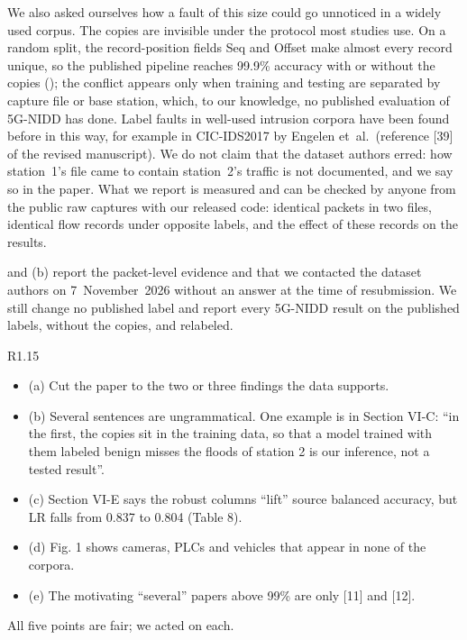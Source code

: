 We also asked ourselves how a fault of this size could go unnoticed in a widely used corpus. The copies are invisible under the protocol most studies use. On a random split, the record-position fields Seq and Offset make almost every record unique, so the published pipeline reaches 99.9\% accuracy with or without the copies (); the conflict appears only when training and testing are separated by capture file or base station, which, to our knowledge, no published evaluation of 5G-NIDD has done. Label faults in well-used intrusion corpora have been found before in this way, for example in CIC-IDS2017 by Engelen et~al.\ (reference [39] of the revised manuscript). We do not claim that the dataset authors erred: how station~1's file came to contain station~2's traffic is not documented, and we say so in the paper. What we report is measured and can be checked by anyone from the public raw captures with our released code: identical packets in two files, identical flow records under opposite labels, and the effect of these records on the results.

\action {} and (b) report the packet-level evidence and that we contacted the dataset authors on 7~November~2026 without an answer at the time of resubmission. We still change no published label and report every 5G-NIDD result on the published labels, without the copies, and relabeled.

\label{rv:R1.15}
\begin{concern}{R1.15}
\begin{itemize}[leftmargin=*, itemsep=0pt]
\item (a) Cut the paper to the two or three findings the data supports.
\item (b) Several sentences are ungrammatical. One example is in Section VI-C: ``in the first, the copies sit in the training data, so that a model trained with them labeled benign misses the floods of station 2 is our inference, not a tested result''.
\item (c) Section VI-E says the robust columns ``lift'' source balanced accuracy, but LR falls from 0.837 to 0.804 (Table 8).
\item (d) Fig. 1 shows cameras, PLCs and vehicles that appear in none of the corpora.
\item (e) The motivating ``several'' papers above 99\% are only [11] and [12].
\end{itemize}
\end{concern}
\response All five points are fair; we acted on each.


